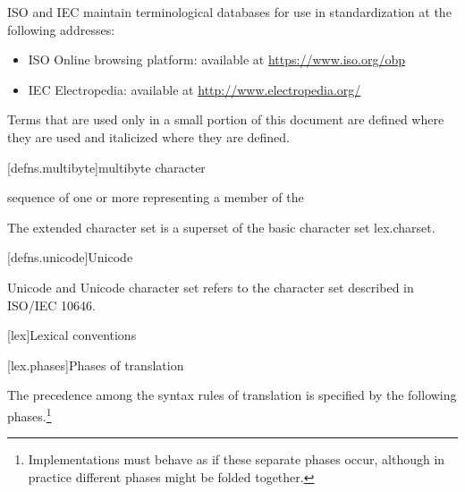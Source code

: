 \documentclass{wg21}
\begin{document}
\pnum
ISO and IEC maintain terminological databases
for use in standardization
at the following addresses:
\begin{itemize}
    \item ISO Online browsing platform: available at \url{https://www.iso.org/obp}
    \item IEC Electropedia: available at \url{http://www.electropedia.org/}
\end{itemize}

\pnum

\pnum
Terms that are used only in a small portion of this document
are defined where they are used and italicized where they are
defined.


[defns.multibyte]{multibyte character}

sequence of one or more  representing a member of the

\begin{removedblock}
\begin{note}
    The extended character set is a superset of the basic character
    set lex.charset.
\end{note}
\end{removedblock}


\begin{addedblock}
[defns.unicode]{Unicode}

Unicode and Unicode character set refers to the character set described in ISO/IEC 10646.  

\end{addedblock}


[lex]{Lexical conventions}



[lex.phases]{Phases of translation}%

\pnum
{}%
The precedence among the syntax rules of translation is specified by the
following phases.\footnote{Implementations must behave as if these separate phases
    occur, although in practice different phases might be folded together.}
\end{document}
